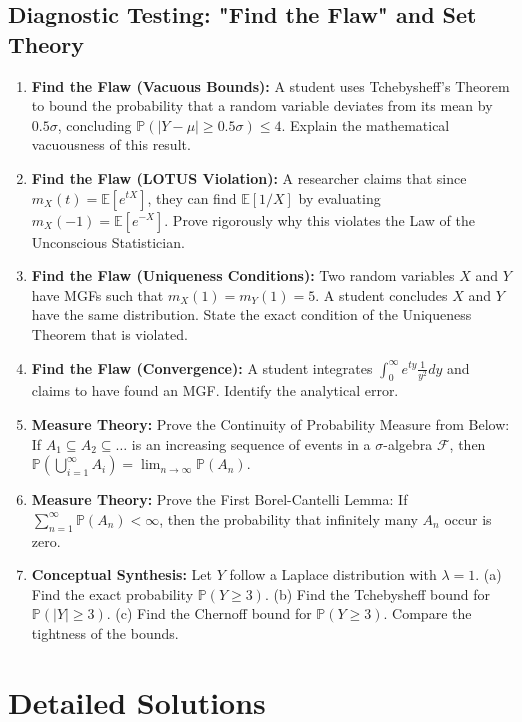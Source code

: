\documentclass[11pt, a4paper]{article}
\theoremstyle{definition}
\theoremstyle{remark}
\newcommand{\E}{\mathbb{E}}
\newcommand{\Prob}{\mathbb{P}}
\newcommand{\F}{\mathcal{F}}
\begin{document}
\subsection{Diagnostic Testing: "Find the Flaw" and Set Theory}
\begin{enumerate}[label=\textbf{\arabic*.}, resume]
    \item \textbf{Find the Flaw (Vacuous Bounds):} A student uses Tchebysheff's Theorem to bound the probability that a random variable deviates from its mean by $0.5\sigma$, concluding $\Prob(|Y - \mu| \ge 0.5\sigma) \le 4$. Explain the mathematical vacuousness of this result.
    \item \textbf{Find the Flaw (LOTUS Violation):} A researcher claims that since $m_X(t) = \E[e^{tX}]$, they can find $\E[1/X]$ by evaluating $m_X(-1) = \E[e^{-X}]$. Prove rigorously why this violates the Law of the Unconscious Statistician.
    \item \textbf{Find the Flaw (Uniqueness Conditions):} Two random variables $X$ and $Y$ have MGFs such that $m_X(1) = m_Y(1) = 5$. A student concludes $X$ and $Y$ have the same distribution. State the exact condition of the Uniqueness Theorem that is violated.
    \item \textbf{Find the Flaw (Convergence):} A student integrates $\int_0^\infty e^{ty} \frac{1}{y^2} dy$ and claims to have found an MGF. Identify the analytical error.
    \item \textbf{Measure Theory:} Prove the Continuity of Probability Measure from Below: If $A_1 \subseteq A_2 \subseteq \dots$ is an increasing sequence of events in a $\sigma$-algebra $\F$, then $\Prob(\bigcup_{i=1}^\infty A_i) = \lim_{n \to \infty} \Prob(A_n)$.
    \item \textbf{Measure Theory:} Prove the First Borel-Cantelli Lemma: If $\sum_{n=1}^\infty \Prob(A_n) < \infty$, then the probability that infinitely many $A_n$ occur is zero.
    \item \textbf{Conceptual Synthesis:} Let $Y$ follow a Laplace distribution with $\lambda = 1$. (a) Find the exact probability $\Prob(Y \ge 3)$. (b) Find the Tchebysheff bound for $\Prob(|Y| \ge 3)$. (c) Find the Chernoff bound for $\Prob(Y \ge 3)$. Compare the tightness of the bounds.
\end{enumerate}

\newpage

\section{Detailed Solutions}
\end{document}
